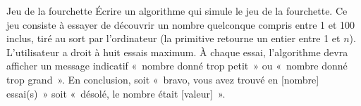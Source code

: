 	\begin{Exercice}{Jeu de la fourchette}
		Écrire un algorithme qui simule le jeu de la
		fourchette. Ce jeu consiste à essayer de découvrir un nombre quelconque
		compris entre 1 et 100 inclus, tiré au sort par l’ordinateur (la primitive
		 retourne un entier entre 1 et $n$). 
		L’utilisateur a droit à huit essais
		maximum. À chaque essai, l’algorithme devra afficher un message
		indicatif «~nombre donné trop petit~» ou «~nombre donné trop grand~».
		En conclusion, soit «~bravo, vous avez trouvé en [nombre] essai(s)~» soit
		«~désolé, le nombre était [valeur]~».
	\end{Exercice}
	
